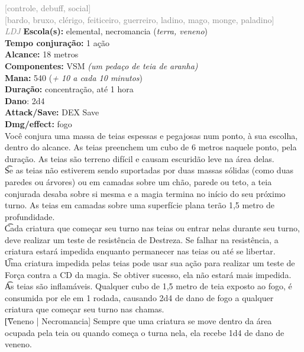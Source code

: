 \documentclass{RPG_Adventure}[2021/10/20]
\begin{document}
{\scriptsize \textcolor{gray}{[controle, debuff, social]\\}}
{\scriptsize \textcolor{gray}{[bardo, bruxo, clérigo, feiticeiro, guerreiro, ladino, mago, monge, paladino]\\}}
{\tiny \textcolor{gray}{\textit{LDJ}}}
{\small \t \textbf{Escola(s):} elemental, necromancia (\textit{terra, veneno})\\\t \textbf{Tempo conjuração:} 1 ação\\\t \textbf{Alcance:} 18 metros\\\t \textbf{Componentes:} VSM \textit{(um pedaço de teia de aranha)}\\\t \textbf{Mana:} 540 (\textit{+ 10 a cada 10 minutos})\\\t \textbf{Duração:} concentração, até 1 hora\\\t \textbf{Dano}: 2d4\\\t \textbf{Attack/Save:} DEX Save\\\t \textbf{Dmg/effect:} fogo\\}
{\normalsize Você conjura uma massa de teias espessas e pegajosas num ponto, à sua escolha, dentro do alcance. As teias preenchem um cubo de 6 metros naquele ponto, pela duração. As teias são terreno difícil e causam escuridão leve na área delas.\\\t Se as teias não estiverem sendo suportadas por duas massas sólidas (como duas paredes ou árvores) ou em camadas sobre um chão, parede ou teto, a teia conjurada desaba sobre si mesma e a magia termina no início do seu próximo turno. As teias em camadas sobre uma superfície plana terão 1,5 metro de profundidade.\\\t Cada criatura que começar seu turno nas teias ou entrar nelas durante seu turno, deve realizar um teste de resistência de Destreza. Se falhar na resistência, a criatura estará impedida enquanto permanecer nas teias ou até se libertar.\\\t Uma criatura impedida pelas teias pode usar sua ação para realizar um teste de Força contra a CD da magia. Se obtiver sucesso, ela não estará mais impedida.\\\t As teias são inflamáveis. Qualquer cubo de 1,5 metro de teia exposto ao fogo, é consumida por ele em 1 rodada, causando 2d4 de dano de fogo a qualquer criatura que começar seu turno nas chamas.\\\t [Veneno | Necromancia] Sempre que uma criatura se move dentro da área ocupada pela teia ou quando começa o turna nela, ela recebe 1d4 de dano de veneno.\\}
\end{document}

